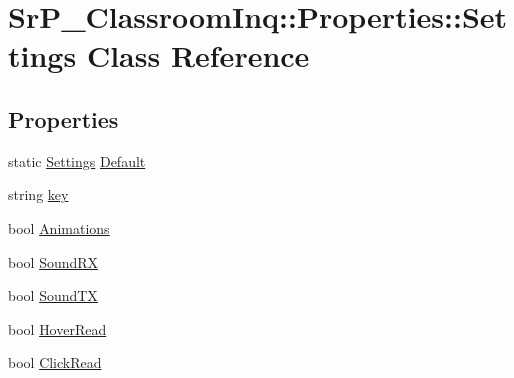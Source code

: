 \hypertarget{class_sr_p___classroom_inq_1_1_properties_1_1_settings}{
\section{\-Sr\-P\-\_\-\-Classroom\-Inq\-:\-:\-Properties\-:\-:\-Settings \-Class \-Reference}
\label{class_sr_p___classroom_inq_1_1_properties_1_1_settings}
}
\subsection*{\-Properties}
\begin{DoxyCompactItemize}
\item 
static \hyperlink{class_sr_p___classroom_inq_1_1_properties_1_1_settings}{\-Settings} \hyperlink{class_sr_p___classroom_inq_1_1_properties_1_1_settings_a5c8b0314d6aca6beb6e0cfbc82fd3754}{\-Default}
\item 
string \hyperlink{class_sr_p___classroom_inq_1_1_properties_1_1_settings_adcf8c99db5c2978cebd00b77880dc4f9}{key}
\item 
bool \hyperlink{class_sr_p___classroom_inq_1_1_properties_1_1_settings_ab4e4d47d4289ea293aa6c3176ef7ba39}{\-Animations}
\item 
bool \hyperlink{class_sr_p___classroom_inq_1_1_properties_1_1_settings_ab0ec9af30232e0f23083548e3b7242a2}{\-Sound\-R\-X}
\item 
bool \hyperlink{class_sr_p___classroom_inq_1_1_properties_1_1_settings_a0baa5402bcfc0c013d2c43fd95adc7e2}{\-Sound\-T\-X}
\item 
bool \hyperlink{class_sr_p___classroom_inq_1_1_properties_1_1_settings_a9e2211fd7a7199dbfaa600115f7a2184}{\-Hover\-Read}
\item 
bool \hyperlink{class_sr_p___classroom_inq_1_1_properties_1_1_settings_af45458c33afb096610d416c61ac86e16}{\-Click\-Read}
\end{DoxyCompactItemize}


